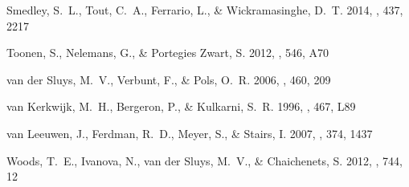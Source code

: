 \documentclass[apjl]{emulateapj}
\begin{document}
\begin{thebibliography}{36}
{Smedley}, S.~L., {Tout}, C.~A., {Ferrario}, L., \& {Wickramasinghe}, D.~T.
  2014, \mnras, 437, 2217

{Toonen}, S., {Nelemans}, G., \& {Portegies Zwart}, S. 2012, \aap, 546, A70

{van der Sluys}, M.~V., {Verbunt}, F., \& {Pols}, O.~R. 2006, \aap, 460, 209

{van Kerkwijk}, M.~H., {Bergeron}, P., \& {Kulkarni}, S.~R. 1996, \apjl, 467,
  L89

{van Leeuwen}, J., {Ferdman}, R.~D., {Meyer}, S., \& {Stairs}, I. 2007, \mnras,
  374, 1437

{Woods}, T.~E., {Ivanova}, N., {van der Sluys}, M.~V., \& {Chaichenets}, S.
  2012, \apj, 744, 12

\end{thebibliography}


%
  
\end{document}

